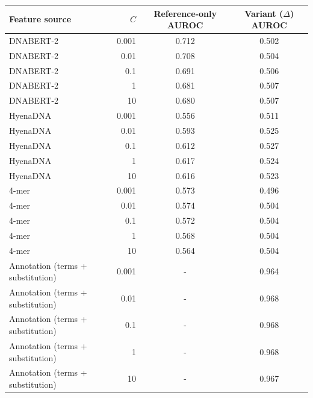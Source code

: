 \begin{tabular}{lrcc}\toprule
Feature source & $C$ & Reference-only AUROC & Variant ($\Delta$) AUROC\\\midrule
DNABERT-2 & 0.001 & 0.712 & 0.502\\
DNABERT-2 & 0.01 & 0.708 & 0.504\\
DNABERT-2 & 0.1 & 0.691 & 0.506\\
DNABERT-2 & 1 & 0.681 & 0.507\\
DNABERT-2 & 10 & 0.680 & 0.507\\
HyenaDNA & 0.001 & 0.556 & 0.511\\
HyenaDNA & 0.01 & 0.593 & 0.525\\
HyenaDNA & 0.1 & 0.612 & 0.527\\
HyenaDNA & 1 & 0.617 & 0.524\\
HyenaDNA & 10 & 0.616 & 0.523\\
4-mer & 0.001 & 0.573 & 0.496\\
4-mer & 0.01 & 0.574 & 0.504\\
4-mer & 0.1 & 0.572 & 0.504\\
4-mer & 1 & 0.568 & 0.504\\
4-mer & 10 & 0.564 & 0.504\\
Annotation (terms + substitution) & 0.001 & - & 0.964\\
Annotation (terms + substitution) & 0.01 & - & 0.968\\
Annotation (terms + substitution) & 0.1 & - & 0.968\\
Annotation (terms + substitution) & 1 & - & 0.968\\
Annotation (terms + substitution) & 10 & - & 0.967\\
\bottomrule\end{tabular}
